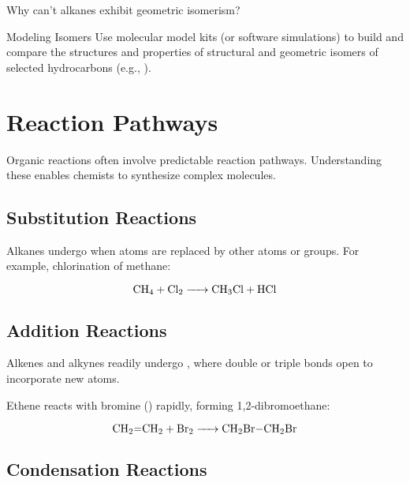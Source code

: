 \begin{stopandthink}
Why can't alkanes exhibit geometric isomerism?
\end{stopandthink}

\begin{investigation}{Modeling Isomers}
Use molecular model kits (or software simulations) to build and compare the structures and properties of structural and geometric isomers of selected hydrocarbons (e.g., ).
\end{investigation}

\FloatBarrier

\section{Reaction Pathways}
\FloatBarrier
\FloatBarrier
\FloatBarrier

Organic reactions often involve predictable reaction pathways. Understanding these enables chemists to synthesize complex molecules.

\subsection{Substitution Reactions}
\FloatBarrier
\FloatBarrier
\FloatBarrier

Alkanes undergo  when atoms are replaced by other atoms or groups. For example, chlorination of methane:

\[
\ce{CH4 + Cl2 -> CH3Cl + HCl}
\]


\subsection{Addition Reactions}
\FloatBarrier
\FloatBarrier
\FloatBarrier

Alkenes and alkynes readily undergo , where double or triple bonds open to incorporate new atoms.

\begin{example}
Ethene reacts with bromine () rapidly, forming 1,2-dibromoethane:

\[
\ce{CH2=CH2 + Br2 -> CH2Br-CH2Br}
\]
\end{example}

\subsection{Condensation Reactions}
\FloatBarrier
\FloatBarrier
\FloatBarrier

